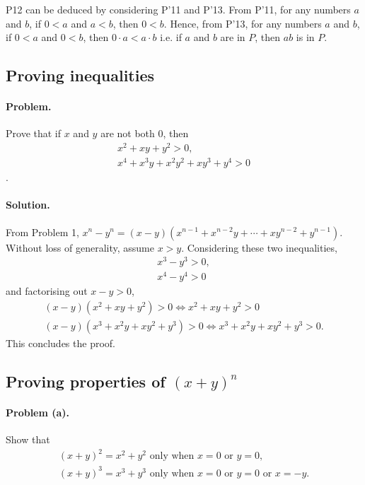 \documentclass{article}
\begin{document}
P12 can be deduced by considering P'11 and P'13. From P'11, for any numbers $a$ and $b$, if $0 < a$ and $a < b$, then $0 < b$. Hence, from P'13, for any numbers $a$ and $b$, if $0 < a$ and $0 < b$, then $0 \cdot a < a \cdot b$ i.e. if $a$ and $b$ are in $P$, then $ab$ is in $P$.

\setcounter{subsection}{14}
\subsection{Proving inequalities}

\paragraph{Problem.} Prove that if $x$ and $y$ are not both 0, then \begin{gather*}
  x^2 + xy + y^2 > 0, \\
  x^4 + x^3y + x^2y^2 + xy^3 + y^4 > 0
\end{gather*}.

\paragraph{Solution.} From Problem 1, $x^n - y^n = (x - y)(x^{n-1} + x^{n-2}y + \cdots + xy^{n-2} + y^{n-1})$. Without loss of generality, assume $x > y$. Considering these two inequalities, \begin{gather*}
  x^3 - y^3 > 0, \\
  x^4 - y^4 > 0
\end{gather*} and factorising out $x - y > 0$, \begin{gather*}
  (x - y)(x^2 + xy + y^2) > 0 \iff x^2 + xy + y^2 > 0 \\
  (x - y)(x^3 + x^2y + xy^2 + y^3) > 0 \iff x^3 + x^2y + xy^2 + y^3 > 0.
\end{gather*} This concludes the proof.

\setcounter{subsection}{15}
\subsection{Proving properties of $(x + y )^n$}

\paragraph{Problem (a).} Show that \begin{gather*}
  (x + y)^2 = x^2 + y^2 \text{ only when } x = 0 \text{ or } y = 0, \\
  (x + y)^3 = x^3 + y^3 \text{ only when } x = 0 \text{ or } y = 0 \text{ or } x = -y.
\end{gather*}
\end{document}
